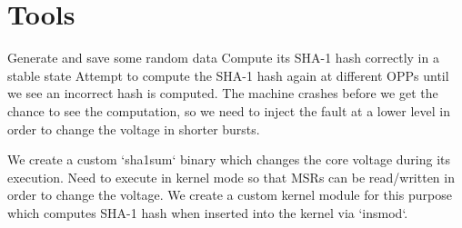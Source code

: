 \section{Tools}

Generate and save some random data
Compute its SHA-1 hash correctly in a stable state
Attempt to compute the SHA-1 hash again at different OPPs until we see an
incorrect hash is computed. The machine crashes before we get the chance to see
the computation, so we need to inject the fault at a lower level in order to
change the voltage in shorter bursts.

We create a custom `sha1sum` binary which changes the core voltage during its
execution.
Need to execute in kernel mode so that MSRs can be read/written in order to
change the voltage.
We create a custom kernel module for this purpose which computes SHA-1 hash
when inserted into the kernel via `insmod`.
